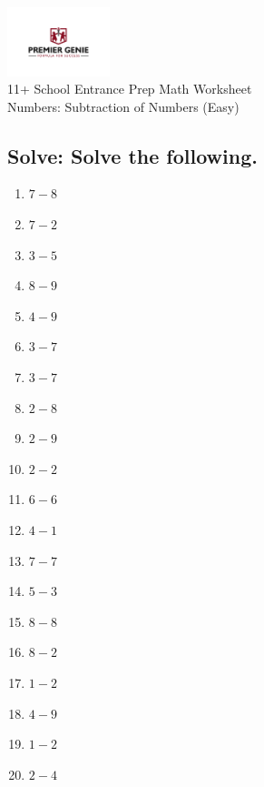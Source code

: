 \documentclass{article}
\begin{document}
\begin{center}
\includegraphics[width=3cm]{PREMGENIEJPG.jpg}\\
{\Large 11+ School Entrance Prep Math Worksheet}\\
{\Medium Numbers: Subtraction of Numbers (Easy)}\\

\end{center}

\subsection*{Solve: Solve the following.}

\begin{enumerate}
\item $\displaystyle {7}-{8} $ \ 
\item $\displaystyle {7}-{2} $ \ 
\item $\displaystyle {3}-{5} $ \ 
\item $\displaystyle {8}-{9} $ \ 
\item $\displaystyle {4}-{9} $ \ 
\item $\displaystyle {3}-{7} $ \ 
\item $\displaystyle {3}-{7} $ \ 
\item $\displaystyle {2}-{8} $ \ 
\item $\displaystyle {2}-{9} $ \ 
\item $\displaystyle {2}-{2} $ \ 
\item $\displaystyle {6}-{6} $ \ 
\item $\displaystyle {4}-{1} $ \ 
\item $\displaystyle {7}-{7} $ \ 
\item $\displaystyle {5}-{3} $ \ 
\item $\displaystyle {8}-{8} $ \ 
\item $\displaystyle {8}-{2} $ \ 
\item $\displaystyle {1}-{2} $ \ 
\item $\displaystyle {4}-{9} $ \ 
\item $\displaystyle {1}-{2} $ \ 
\item $\displaystyle {2}-{4} $ \ 


\end{enumerate}
\end{document}

